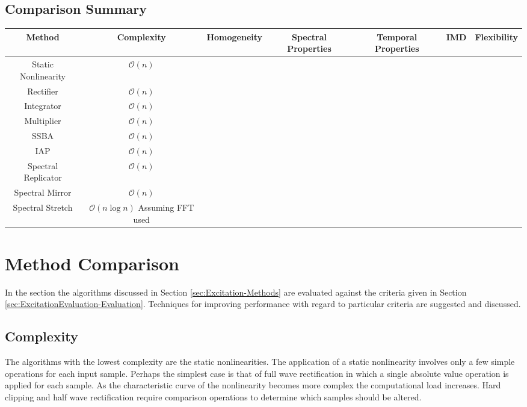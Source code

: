 \begin{landscape}
\section{Comparison Summary}
\label{sec:ExcitationEvaluation-Summary}

	\begin{tabular}{|c|c|c|c|c|c|c|}
		\hline
		\bf{Method} & \bf{Complexity} & \bf{Homogeneity} & \bf{Spectral Properties} & \bf{Temporal Properties} &
		\bf{IMD} & \bf{Flexibility} \\ %
		\hline
		Static Nonlinearity & $\mathcal{O}(n)$ & & & & & \\
		\hline
		Rectifier & $\mathcal{O}(n)$ & & & & & \\
		\hline
		Integrator & $\mathcal{O}(n)$ & & & & & \\
		\hline
		Multiplier & $\mathcal{O}(n)$ & & & & & \\
		\hline
		SSBA & $\mathcal{O}(n)$ & & & & & \\
		\hline
		IAP & $\mathcal{O}(n)$ & & & & & \\
		\hline
		Spectral Replicator & $\mathcal{O}(n)$ & & & & & \\
		\hline
		Spectral Mirror & $\mathcal{O}(n)$ & & & & & \\
		\hline
		Spectral Stretch & $\mathcal{O}(n\log{n})$ Assuming FFT used & & & & & \\
		\hline
	\end{tabular}

\end{landscape}

\section{Method Comparison}
\label{sec:ExcitationEvaluation-Comparison}
	In the section the algorithms discussed in Section \ref{sec:Excitation-Methods} are evaluated against the criteria
	given in Section \ref{sec:ExcitationEvaluation-Evaluation}. Techniques for improving performance with regard to
	particular criteria are suggested and discussed. 

	\subsection{Complexity}
	\label{sec:ExcitationEvaluation-Comparison-Complexity}
		The algorithms with the lowest complexity are the static nonlinearities. The application of a static
		nonlinearity involves only a few simple operations for each input sample. Perhaps the simplest case is that
		of full wave rectification in which a single absolute value operation is applied for each sample. As the
		characteristic curve of the nonlinearity becomes more complex the computational load increases. Hard
		clipping and half wave rectification require comparison operations to determine which samples should be
		altered. 

